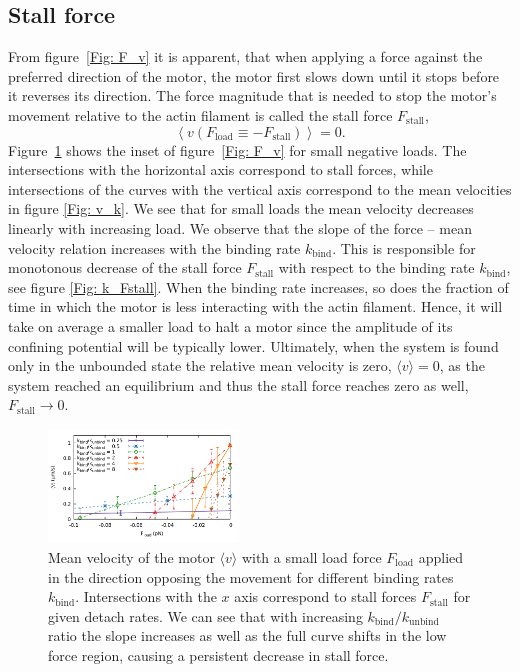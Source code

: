 \documentclass[aps,pre,twocolumn,showpacs,showkeys]{revtex4-1}
\begin{document}
\subsection{Stall force}
From figure~\ref{Fig: F_v} it is apparent, that when applying a force against the preferred direction of the motor, 
the motor first slows down until it stops before it reverses its direction. 
The force magnitude that is needed to stop the motor's movement relative to the actin filament is called the stall force $F_\text{stall}$,  
\[
\left\langle v ( F_\text{load} \equiv -F_\text{stall} ) \right\rangle = 0 .
\]
Figure~\ref{Fig: F_v_zoom} shows the inset of figure~\ref{Fig: F_v} for small negative loads. 
The intersections with the horizontal axis correspond to stall forces,  
while intersections of the curves with the vertical axis correspond to the mean velocities in figure \ref{Fig: v_k}. 
We see that for small loads the mean velocity decreases linearly with increasing load. 
We observe that the slope of the force -- mean velocity relation increases with the binding rate $k_\text{bind}$. 
This is responsible for monotonous decrease of the stall force $F_\text{stall}$ with respect to the binding rate $k_\text{bind}$, see figure \ref{Fig: k_Fstall}.
When the binding rate increases, so does the fraction of time in which the motor is less interacting with the actin filament. 
Hence, it will take on average a smaller load to halt a motor since the amplitude of its confining potential will be typically lower.
Ultimately, when the system is found only in the unbounded state the relative mean velocity is zero, $\langle v \rangle = 0$, as the system reached an equilibrium 
and thus the stall force reaches zero as well, $F_\text{stall} \to 0$.
\begin{figure}[t]
\centering
\includegraphics[width=0.45\textwidth,height=!]{F_v_zoom}
\caption{Mean velocity of the motor $\langle v \rangle$ with a small load force $F_\text{load}$ applied in the direction opposing the movement for different binding rates $k_\text{bind}$.
Intersections with the $x$ axis correspond to stall forces $F_\text{stall}$ for given detach rates. 
We can see that with increasing $k_\text{bind}/k_\text{unbind}$ ratio the slope increases as well as the full curve shifts in the low force region, causing a persistent decrease in stall force.  
}
\label{Fig: F_v_zoom} 
\end{figure}
\end{document}
